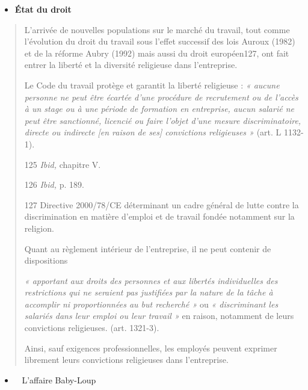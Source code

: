\begin{itemize}
\item
  \textbf{État du droit}
\end{itemize}

\begin{quote}
L'arrivée de nouvelles populations sur le marché du travail, tout comme
l'évolution du droit du travail sous l'effet successif des lois Auroux
(1982) et de la réforme Aubry (1992) mais aussi du droit européen127,
ont fait entrer la liberté et la diversité religieuse dans l'entreprise.

Le Code du travail protège et garantit la liberté religieuse : \emph{«
aucune personne ne peut être écartée d'une procédure de recrutement ou
de l'accès à un stage ou à une période de formation en entreprise, aucun
salarié ne peut être sanctionné, licencié ou faire l'objet d'une mesure
discriminatoire, directe ou indirecte {[}en raison de ses{]} convictions
religieuses »} (art. L 1132-1).

125 \emph{Ibid,} chapitre V.

126 \emph{Ibid,} p. 189.

127 Directive 2000/78/CE déterminant un cadre général de lutte contre la
discrimination en matière d'emploi et de travail fondée notamment sur la
religion.



Quant au règlement intérieur de l'entreprise, il ne peut contenir de
dispositions

\emph{« apportant aux droits des personnes et aux libertés individuelles
des restrictions qui ne seraient pas justifiées par la nature de la
tâche à accomplir ni proportionnées au but recherché »} ou \emph{«
discriminant les salariés dans leur emploi ou leur travail »} en raison,
notamment de leurs convictions religieuses. (art. 1321-3).

Ainsi, sauf exigences professionnelles, les employés peuvent exprimer
librement leurs convictions religieuses dans l'entreprise.
\end{quote}

\begin{itemize}
\item ~
  L'affaire Baby-Loup
\end{itemize}

